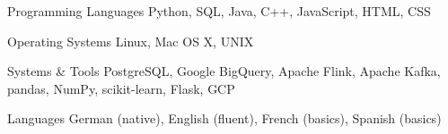 

\begin{cvskills}

  \cvskill
    {Programming Languages} %
    {Python, SQL, Java, C++, JavaScript,  HTML, CSS} %

  \cvskill
    {Operating Systems} %
    {Linux, Mac OS X, UNIX} %

  \cvskill
    {Systems \& Tools} %
    {PostgreSQL, Google BigQuery, Apache Flink, Apache Kafka, pandas, NumPy, scikit-learn, Flask, GCP} %

  \cvskill
    {Languages} %
    {German (native), English (fluent), French (basics), Spanish (basics)} %

\end{cvskills}
